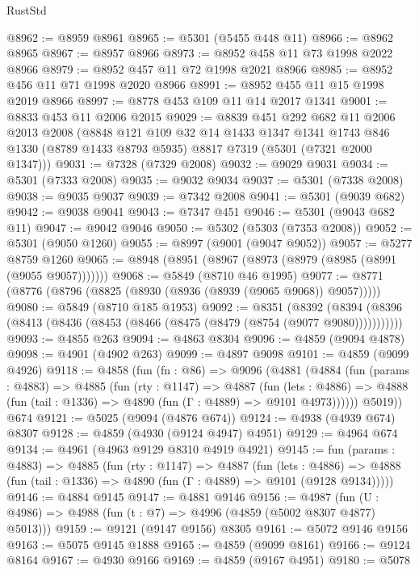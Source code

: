 \begin{lexlean}{RustStd}
\begin{coremodule}
@8962 := @8959 @8961
@8965 := @5301 (@5455 @448 @11)
@8966 := @8962 @8965
@8967 := @8957 @8966
@8973 := @8952 @458 @11 @73 @1998 @2022 @8966
@8979 := @8952 @457 @11 @72 @1998 @2021 @8966
@8985 := @8952 @456 @11 @71 @1998 @2020 @8966
@8991 := @8952 @455 @11 @15 @1998 @2019 @8966
@8997 := @8778 @453 @109 @11 @14 @2017 @1341
@9001 := @8833 @453 @11 @2006 @2015
@9029 := @8839
    @451
    @292
    @682
    @11
    @2006
    @2013
    @2008
    (@8848
      @121
      @109
      @32
      @14
      @1433
      @1347
      @1341
      @1743
      @846
      @1330
      (@8789 @1433 @8793 @5935)
      @8817
      @7319
      (@5301 (@7321 @2000 @1347)))
@9031 := @7328 (@7329 @2008)
@9032 := @9029 @9031
@9034 := @5301 (@7333 @2008)
@9035 := @9032 @9034
@9037 := @5301 (@7338 @2008)
@9038 := @9035 @9037
@9039 := @7342 @2008
@9041 := @5301 (@9039 @682)
@9042 := @9038 @9041
@9043 := @7347 @451
@9046 := @5301 (@9043 @682 @11)
@9047 := @9042 @9046
@9050 := @5302 (@5303 (@7353 @2008))
@9052 := @5301 (@9050 @1260)
@9055 := @8997 (@9001 (@9047 @9052))
@9057 := @5277 @8759 @1260
@9065 := @8948 (@8951 (@8967 (@8973 (@8979 (@8985 (@8991 (@9055 @9057)))))))
@9068 := @5849 (@8710 @46 @1995)
@9077 := @8771 (@8776 (@8796 (@8825 (@8930 (@8936 (@8939 (@9065 @9068)) @9057)))))
@9080 := @5849 (@8710 @185 @1953)
@9092 := @8351
    (@8392 (@8394 (@8396 (@8413 (@8436 (@8453 (@8466 (@8475 (@8479 (@8754 (@9077 @9080)))))))))))
@9093 := @4855 @263
@9094 := @4863 @8304
@9096 := @4859 (@9094 @4878)
@9098 := @4901 (@4902 @263)
@9099 := @4897 @9098
@9101 := @4859 (@9099 @4926)
@9118 := @4858
    (fun (fn : @86) =>
    @9096
      (@4881
        (@4884
          (fun (params : @4883) =>
          @4885
            (fun (rty : @1147) =>
            @4887
              (fun (lets : @4886) =>
              @4888 (fun (tail : @1336) => @4890 (fun (Γ : @4889) => @9101 @4973))))))
        @5019))
    @674
@9121 := @5025 (@9094 (@4876 @674))
@9124 := @4938 (@4939 @674) @8307
@9128 := @4859 (@4930 (@9124 @4947) @4951)
@9129 := @4964 @674
@9134 := @4961 (@4963 @9129 @8310 @4919 @4921)
@9145 := fun (params : @4883) =>
  @4885
    (fun (rty : @1147) =>
    @4887
      (fun (lets : @4886) =>
      @4888 (fun (tail : @1336) => @4890 (fun (Γ : @4889) => @9101 (@9128 @9134)))))
@9146 := @4884 @9145
@9147 := @4881 @9146
@9156 := @4987 (fun (U : @4986) => @4988 (fun (t : @7) => @4996 (@4859 (@5002 @8307 @4877) @5013)))
@9159 := @9121 (@9147 @9156) @8305
@9161 := @5072 @9146 @9156
@9163 := @5075 @9145 @1888
@9165 := @4859 (@9099 @8161)
@9166 := @9124 @8164
@9167 := @4930 @9166
@9169 := @4859 (@9167 @4951)
@9180 := @5078

\end{coremodule}
\end{lexlean}
